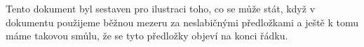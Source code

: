 \documentclass{article}
\begin{document}
\begin{markdown}
  Tento dokument byl sestaven pro ilustraci toho, co se může
  stát, když v dokumentu použijeme běžnou mezeru za
  neslabičnými předložkami a ještě k tomu máme takovou smůlu,
  že se tyto předložky objeví na konci řádku.
\end{markdown}
\end{document}
